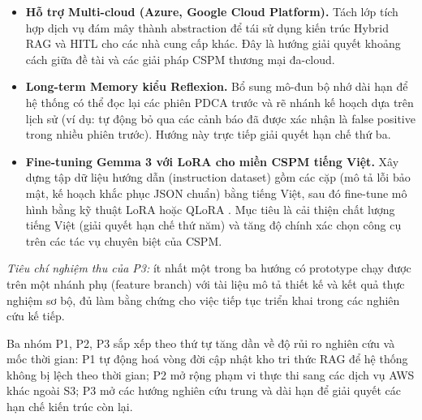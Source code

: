 \begin{itemize}
  \item \textbf{Hỗ trợ Multi-cloud (Azure, Google Cloud Platform).} Tách lớp tích hợp dịch vụ đám mây thành abstraction để tái sử dụng kiến trúc Hybrid RAG và HITL cho các nhà cung cấp khác. Đây là hướng giải quyết khoảng cách giữa đề tài và các giải pháp CSPM thương mại đa-cloud.

  \item \textbf{Long-term Memory kiểu Reflexion.} Bổ sung mô-đun bộ nhớ dài hạn để hệ thống có thể đọc lại các phiên PDCA trước và rẽ nhánh kế hoạch dựa trên lịch sử (ví dụ: tự động bỏ qua các cảnh báo đã được xác nhận là false positive trong nhiều phiên trước). Hướng này trực tiếp giải quyết hạn chế thứ ba.

  \item \textbf{Fine-tuning Gemma 3 với LoRA cho miền CSPM tiếng Việt.} Xây dựng tập dữ liệu hướng dẫn (instruction dataset) gồm các cặp (mô tả lỗi bảo mật, kế hoạch khắc phục JSON chuẩn) bằng tiếng Việt, sau đó fine-tune mô hình bằng kỹ thuật LoRA hoặc QLoRA \cite{dettmers2023qlora}. Mục tiêu là cải thiện chất lượng tiếng Việt (giải quyết hạn chế thứ năm) và tăng độ chính xác chọn công cụ trên các tác vụ chuyên biệt của CSPM.
\end{itemize}

\noindent\textit{Tiêu chí nghiệm thu của P3:} ít nhất một trong ba hướng có prototype chạy được trên một nhánh phụ (feature branch) với tài liệu mô tả thiết kế và kết quả thực nghiệm sơ bộ, đủ làm bằng chứng cho việc tiếp tục triển khai trong các nghiên cứu kế tiếp.

\medskip

\noindent Ba nhóm P1, P2, P3 sắp xếp theo thứ tự tăng dần về độ rủi ro nghiên cứu và mốc thời gian: P1 tự động hoá vòng đời cập nhật kho tri thức RAG để hệ thống không bị lệch theo thời gian; P2 mở rộng phạm vi thực thi sang các dịch vụ AWS khác ngoài S3; P3 mở các hướng nghiên cứu trung và dài hạn để giải quyết các hạn chế kiến trúc còn lại.
